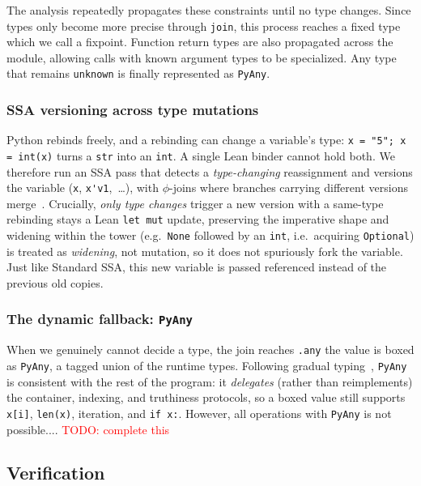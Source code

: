 \documentclass{article}
\newcommand{\code}{\lstinline}
\newcommand{\todo}[1]{\textcolor{red}{TODO: #1}}
\begin{document}
{The analysis repeatedly propagates these constraints until no type changes. Since types only become more precise through \code{join}, this process reaches a fixed type which we call a  fixpoint. Function return types are also propagated across the module, allowing calls with known argument types to be specialized. Any type that remains \code{unknown} is finally represented as \code{PyAny}.


\subsubsection{SSA versioning across type mutations}
\label{sec:ssa}
Python rebinds freely, and a rebinding can change a variable's type:
\code{x = "5"; x = int(x)} turns a \code{str} into an \code{int}. A single Lean binder cannot
hold both. We therefore run an SSA pass that detects a
\emph{type-changing} reassignment and versions the variable (\code{x}, \code{x'v1},~\dots), with
$\phi$-joins where branches carrying different versions merge~\cite{cytron1991ssa}. Crucially,
\emph{only type changes} trigger a new version with a same-type rebinding stays a Lean \code{let mut} update, preserving the imperative shape and widening within the tower (e.g.\ \code{None} followed by an \code{int}, i.e.\ acquiring \code{Optional}) is treated as \emph{widening}, not mutation, so it does not spuriously fork the variable. Just like Standard SSA, this new variable is passed referenced instead of the previous old copies.

\subsubsection{The dynamic fallback: \texttt{PyAny}} \label{sec:pyany}

When we genuinely cannot decide a type, the join reaches \code{.any} the value is
boxed as \code{PyAny}, a tagged union of the runtime types. Following gradual
typing~\cite{siek2006gradual}, \code{PyAny} is consistent with the rest of the program: it
\emph{delegates} (rather than reimplements) the container, indexing, and truthiness protocols, so a boxed value still supports \code{x[i]}, \code{len(x)}, iteration, and \code{if x:}. However, all operations with \code{PyAny} is not possible.... \todo{complete this}


\subsection{Verification}

}
\end{document}
